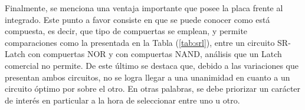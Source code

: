 Finalmente, se menciona una ventaja importante que posee la placa frente al integrado. Este punto a favor consiste en que se puede conocer como está compuesta, es decir, que tipo de compuertas se emplean, y permite comparaciones como la presentada en la Tabla (\ref{tab:srl}), entre un circuito SR-Latch con compuertas NOR y con compuertas NAND, análisis que un Latch comercial no permite. De este último se destaca que, debido a las variaciones que presentan ambos circuitos, no se logra llegar a una unanimidad en cuanto a un circuito óptimo por sobre el otro. En otras palabras, se debe priorizar un carácter de interés en particular a la hora de seleccionar entre uno u otro.